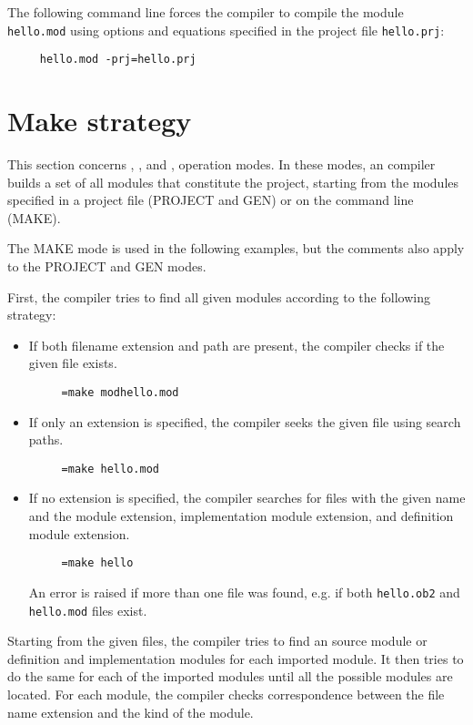 The following command line forces the compiler
to compile the module {\tt hello.mod} using options
and equations specified in the
project file {\tt hello.prj}:

\verb'    '\xc{}\verb' hello.mod -prj=hello.prj'

\section{Make strategy}\label{xc:make}

This section concerns
,
, and
,
operation modes.
In these modes, an \XDS{} compiler builds a set of all modules that
constitute the project, starting from the modules specified in a
project file (PROJECT and GEN) or on the command line (MAKE).

The MAKE mode is used in the following examples, but
the comments also apply to the PROJECT and GEN modes.

First, the compiler tries to find all given modules according to the
following strategy:
\begin{itemize}
\item
        If both filename extension and path are present,
        the compiler checks if the given file exists.

        \verb'    '\xc{}\verb' =make mod'\DirSep{}\verb'hello.mod'

\item
        If only an extension is specified, the compiler seeks
        the given file using search paths.

        \verb'    '\xc{}\verb' =make hello.mod'

\item
        If no extension is specified, the compiler searches for
        files with the given name and the \ot{} module extension, \mt{}
        implementation module extension, and \mt{} definition
        module extension.

        \verb'    '\xc{}\verb' =make hello'

        An error is raised if more than one file was found,
        e.g. if both {\tt hello.ob2} and {\tt hello.mod} files exist.
\end{itemize}

Starting from the given files, the compiler tries to find an \ot{}
source module or \mt{} definition and implementation modules for
each imported module. It then tries to do the same for each of
the imported modules until all the possible modules are located.
For each module, the compiler checks correspondence between the
file name extension and the kind of the module.

